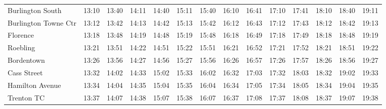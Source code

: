 \begin{center}
\begin{tabular}{@{}lrrrrrrrrrrrrr@{}}
Burlington South & 13:10 & 13:40 & 14:11 & 14:40 & 15:11 & 15:40 & 16:10 & 16:41 & 17:10 & 17:41 & 18:10 & 18:40 & 19:11 \\
Burlington Towne Ctr & 13:12 & 13:42 & 14:13 & 14:42 & 15:13 & 15:42 & 16:12 & 16:43 & 17:12 & 17:43 & 18:12 & 18:42 & 19:13 \\
Florence & 13:18 & 13:48 & 14:19 & 14:48 & 15:19 & 15:48 & 16:18 & 16:49 & 17:18 & 17:49 & 18:18 & 18:48 & 19:19 \\
Roebling & 13:21 & 13:51 & 14:22 & 14:51 & 15:22 & 15:51 & 16:21 & 16:52 & 17:21 & 17:52 & 18:21 & 18:51 & 19:22 \\
Bordentown & 13:26 & 13:56 & 14:27 & 14:56 & 15:27 & 15:56 & 16:26 & 16:57 & 17:26 & 17:57 & 18:26 & 18:56 & 19:27 \\
Cass Street & 13:32 & 14:02 & 14:33 & 15:02 & 15:33 & 16:02 & 16:32 & 17:03 & 17:32 & 18:03 & 18:32 & 19:02 & 19:33 \\
Hamilton Avenue & 13:34 & 14:04 & 14:35 & 15:04 & 15:35 & 16:04 & 16:34 & 17:05 & 17:34 & 18:05 & 18:34 & 19:04 & 19:35 \\
Trenton TC & 13:37 & 14:07 & 14:38 & 15:07 & 15:38 & 16:07 & 16:37 & 17:08 & 17:37 & 18:08 & 18:37 & 19:07 & 19:38 \\
\bottomrule\end{tabular}\end{center}
